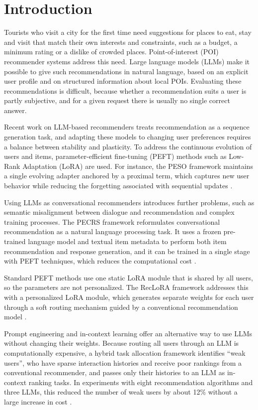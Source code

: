 \documentclass[journal,article,submit,pdftex,moreauthors]{Definitions/mdpi}
\begin{document}

\section{Introduction}\label{sec:intro}

Tourists who visit a city for the first time need suggestions for places to eat, stay and visit that match their own interests and constraints, such as a budget, a minimum rating or a dislike of crowded places. Point-of-interest (POI) recommender systems address this need. Large language models (LLMs) make it possible to give such recommendations in natural language, based on an explicit user profile and on structured information about local POIs. Evaluating these recommendations is difficult, because whether a recommendation suits a user is partly subjective, and for a given request there is usually no single correct answer.

Recent work on LLM-based recommenders treats recommendation as a sequence generation task, and adapting these models to changing user preferences requires a balance between stability and plasticity. To address the continuous evolution of users and items, parameter-efficient fine-tuning (PEFT) methods such as Low-Rank Adaptation (LoRA) are used. For instance, the PESO framework maintains a single evolving adapter anchored by a proximal term, which captures new user behavior while reducing the forgetting associated with sequential updates \citep{yoo2025continual}.

Using LLMs as conversational recommenders introduces further problems, such as semantic misalignment between dialogue and recommendation and complex training processes. The PECRS framework reformulates conversational recommendation as a natural language processing task. It uses a frozen pre-trained language model and textual item metadata to perform both item recommendation and response generation, and it can be trained in a single stage with PEFT techniques, which reduces the computational cost \citep{ravaut2024parameter}.

Standard PEFT methods use one static LoRA module that is shared by all users, so the parameters are not personalized. The RecLoRA framework addresses this with a personalized LoRA module, which generates separate weights for each user through a soft routing mechanism guided by a conventional recommendation model \citep{zhu2024lifelong}.

Prompt engineering and in-context learning offer an alternative way to use LLMs without changing their weights. Because routing all users through an LLM is computationally expensive, a hybrid task allocation framework identifies ``weak users'', who have sparse interaction histories and receive poor rankings from a conventional recommender, and passes only their histories to an LLM as in-context ranking tasks. In experiments with eight recommendation algorithms and three LLMs, this reduced the number of weak users by about 12\% without a large increase in cost \citep{kaur2026efficient}.
\end{document}
